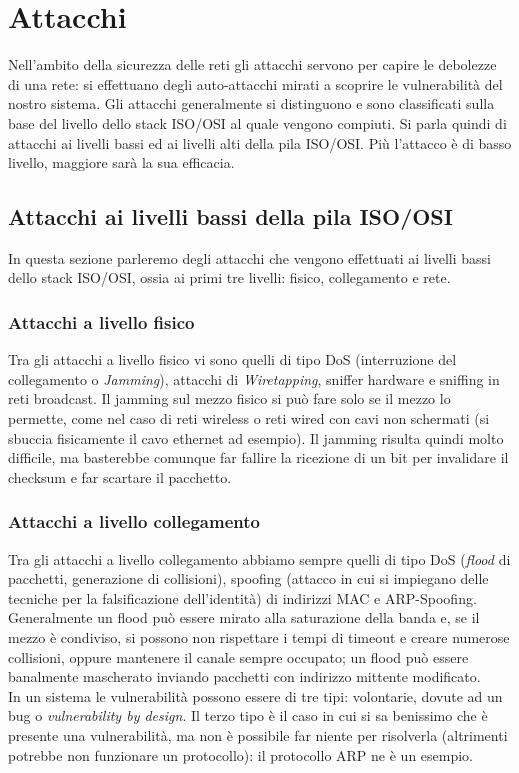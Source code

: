 \chapter{Attacchi}
Nell'ambito della sicurezza delle reti gli attacchi servono per capire le debolezze di una rete: si effettuano degli auto-attacchi mirati a scoprire le vulnerabilità del nostro sistema. Gli attacchi generalmente si distinguono e sono classificati sulla base del livello dello stack ISO/OSI al quale vengono compiuti. Si parla quindi di attacchi ai livelli bassi ed ai livelli alti della pila ISO/OSI. Più l'attacco è di basso livello, maggiore sarà la sua efficacia.

\section{Attacchi ai livelli bassi della pila ISO/OSI}
In questa sezione parleremo degli attacchi che vengono effettuati ai livelli bassi dello stack ISO/OSI, ossia ai primi tre livelli: fisico, collegamento e rete.

\subsection{Attacchi a livello fisico}
Tra gli attacchi a livello fisico vi sono quelli di tipo DoS (interruzione del collegamento o \textit{Jamming}), attacchi di \textit{Wiretapping}, sniffer hardware e sniffing in reti broadcast. Il jamming sul mezzo fisico si può fare solo se il mezzo lo permette, come nel caso di reti wireless o reti wired con cavi non schermati (si sbuccia fisicamente il cavo ethernet ad esempio). Il jamming risulta quindi molto difficile, ma basterebbe comunque far fallire la ricezione di un bit per invalidare il checksum e far scartare il pacchetto.

\subsection{Attacchi a livello collegamento}
Tra gli attacchi a livello collegamento abbiamo sempre quelli di tipo DoS (\textit{flood} di pacchetti, generazione di collisioni), spoofing (attacco in cui si impiegano delle tecniche per la falsificazione dell'identità) di indirizzi MAC e ARP-Spoofing. Generalmente un flood può essere mirato alla saturazione della banda e, se il mezzo è condiviso, si possono non rispettare i tempi di timeout e creare numerose collisioni, oppure mantenere il canale sempre occupato; un flood può essere banalmente mascherato inviando pacchetti con indirizzo mittente modificato.\\
In un sistema le vulnerabilità possono essere di tre tipi: volontarie, dovute ad un bug o \textit{vulnerability by design}. Il terzo tipo è il caso in cui si sa benissimo che è presente una vulnerabilità, ma non è possibile far niente per risolverla (altrimenti potrebbe non funzionare un protocollo): il protocollo ARP ne è un esempio.\\

